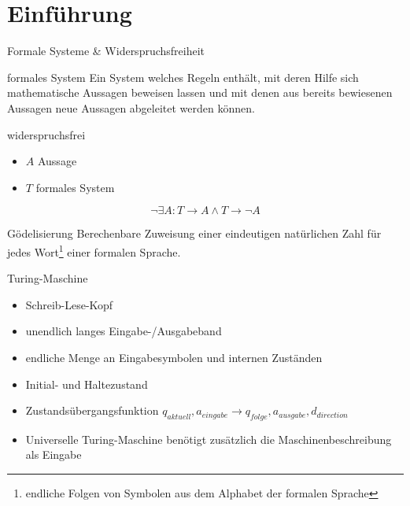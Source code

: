 \section{Einführung}

\begin{frame}{Formale Systeme \& Widerspruchsfreiheit}
    \begin{block}{formales System}
        Ein System welches Regeln enthält, mit deren Hilfe sich mathematische Aussagen beweisen lassen und mit denen aus bereits bewiesenen Aussagen neue Aussagen abgeleitet werden können.
    \end{block}
    \begin{block}{widerspruchsfrei}
        \begin{itemize}
            \item $A$ Aussage
            \item $T$ formales System
        \end{itemize}
        $$\neg\exists A: T\rightarrow{}A \wedge T\rightarrow{}\neg{}A $$
    \end{block}
\end{frame}

\begin{frame}[squeeze]
    \begin{block}{Gödelisierung}
        Berechenbare Zuweisung einer eindeutigen natürlichen Zahl für jedes Wort\footnote{endliche Folgen von Symbolen aus dem Alphabet der formalen Sprache} einer formalen Sprache.
    \end{block}
    \begin{block}{Turing-Maschine}
        \begin{itemize}
            \item Schreib-Lese-Kopf
            \item unendlich langes Eingabe-/Ausgabeband
            \item endliche Menge an Eingabesymbolen und internen Zuständen
            \item Initial- und Haltezustand
            \item Zustandsübergangsfunktion $q_{aktuell}, a_{eingabe} \rightarrow{} q_{folge}, a_{ausgabe}, d_{direction}$
            \item Universelle Turing-Maschine benötigt zusätzlich die Maschinenbeschreibung als Eingabe
        \end{itemize}
    \end{block}
\end{frame}

